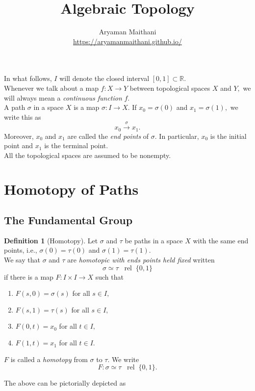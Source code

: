 \documentclass[12pt]{article}
\title{Algebraic Topology}
\author{Aryaman Maithani\\\url{https://aryamanmaithani.github.io/}}
\theoremstyle{definition}
\numberwithin{thm}{section}
\newtheorem{defn}[thm]{Definition}
\newcommand{\rel}{\;\;\operatorname{rel}\;}
\begin{document}
\maketitle

In what follows, $I$ will denote the closed interval $[0, 1] \subset \mathbb{R}.$\\
Whenever we talk about a map $f:X\to Y$ between topological spaces $X$ and $Y,$ we will always mean a \emph{continuous function} $f.$\\
A path $\sigma$ in a space $X$ is a map $\sigma: I \to X.$ If $x_0 = \sigma(0)$ and $x_1 = \sigma(1),$ we write this as
\begin{equation*} 
	x_0 \overset{\sigma}{\longrightarrow} x_1.
\end{equation*}
Moreover, $x_0$ and $x_1$ are called the \emph{end points} of $\sigma.$ In particular, $x_0$ is the initial point and $x_1$ is the terminal point.\\
All the topological spaces are assumed to be nonempty.
\section{Homotopy of Paths}
%
\subsection{The Fundamental Group}

\begin{defn}[Homotopy]
	Let $\sigma$ and $\tau$ be paths in a space $X$ with the same end points, i.e., $\sigma(0) = \tau(0)$ and $\sigma(1) = \tau(1).$\\
	We say that $\sigma$ and $\tau$ are \emph{homotopic with ends points held fixed} written
	\begin{equation*} 
		\sigma \simeq \tau \rel \{0, 1\}
	\end{equation*}
	if there is a map $F: I \times I \to X$ such that
	\begin{enumerate}
		\item $F(s, 0) = \sigma(s)$ for all $s \in I,$
		\item $F(s, 1) = \tau(s)$ for all $s \in I,$
		\item $F(0, t) = x_0$ for all $t \in I,$
		\item $F(1, t) = x_1$ for all $t \in I.$
	\end{enumerate}
	$F$ is called a \emph{homotopy} from $\sigma$ to $\tau.$ We write
	\begin{equation*} 
		F : \sigma \simeq \tau \rel \{0, 1\}.
	\end{equation*}
\end{defn}
The above can be pictorially depicted as
\end{document}
